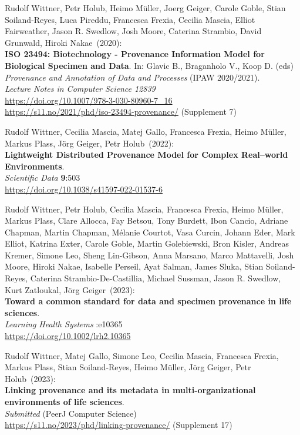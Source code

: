 \begin{thebibliography}{9}
Rudolf Wittner, Petr Holub, Heimo Müller, Joerg Geiger, Carole Goble, Stian Soiland-Reyes, Luca Pireddu, Francesca Frexia, Cecilia Mascia, Elliot Fairweather, Jason R. Swedlow, Josh Moore, Caterina Strambio, David Grunwald, Hiroki Nakae~(2020): \\
\textbf{ISO 23494: Biotechnology - Provenance Information Model for Biological Specimen and Data}.
In: Glavic B., Braganholo V., Koop D. (eds) 
\emph{Provenance and Annotation of Data and Processes} (IPAW 2020/2021).\\
\emph{Lecture Notes in Computer Science 12839}\\
\url{https://doi.org/10.1007/978-3-030-80960-7_16} \\
\url{https://s11.no/2021/phd/iso-23494-provenance/}
(Supplement 7)

Rudolf Wittner, Cecilia Mascia, Matej Gallo, Francesca Frexia, Heimo Müller, Markus Plass, Jörg Geiger, Petr Holub~(2022): \\
\textbf{Lightweight Distributed Provenance Model for Complex Real--world
Environments}.\\
\emph{Scientific Data} \textbf{9}:503 \\
\url{https://doi.org/10.1038/s41597-022-01537-6}

Rudolf Wittner, Petr Holub, Cecilia Mascia, Francesca Frexia, Heimo Müller, Markus Plass, Clare Allocca, Fay Betsou, Tony Burdett, Ibon Cancio, Adriane Chapman, Martin Chapman, Mélanie Courtot, Vasa Curcin, Johann Eder, Mark Elliot, Katrina Exter, Carole Goble, Martin Golebiewski, Bron Kisler, Andreas Kremer, Simone Leo, Sheng Lin-Gibson, Anna Marsano, Marco Mattavelli, Josh Moore, Hiroki Nakae, Isabelle Perseil, Ayat Salman, James Sluka, Stian Soiland-Reyes, Caterina Strambio-De-Castillia, Michael Sussman, Jason R. Swedlow, Kurt Zatloukal, Jörg Geiger~(2023): \\
\textbf{Toward a common standard for data and specimen provenance in life sciences}.\\
\emph{Learning Health Systems} :e10365 \\
\url{https://doi.org/10.1002/lrh2.10365}

Rudolf Wittner, Matej Gallo, Simone Leo, Cecilia Mascia, Francesca Frexia, Markus Plass, Stian Soiland-Reyes, Heimo Müller, Jörg Geiger, Petr Holub~(2023): \\
\textbf{Linking provenance and its metadata in multi-organizational environments of life sciences}.\\
\emph{Submitted} (PeerJ Computer Science)\\
\url{https://s11.no/2023/phd/linking-provenance/}
(Supplement 17)


\end{thebibliography}
